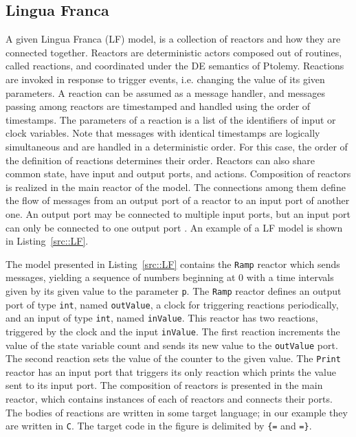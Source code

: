 \subsection{Lingua Franca}

\newcommand{\ReName}[0]{\mathit{ReName}}
\newcommand{\outport}[0]{\mathit{out}}
\newcommand{\inport}[0]{\mathit{in}}
\newcommand{\action}[0]{\mathit{ac}}
\newcommand{\reaction}[0]{\mathit{Reaction}}


A given Lingua Franca (LF) model, is a collection of reactors and how they are connected together. Reactors are deterministic actors composed out of routines, called reactions, and coordinated under the DE semantics of Ptolemy. Reactions are invoked in response to trigger events, i.e. changing the value of its given parameters. A reaction can be assumed as a message handler, and messages passing among reactors are timestamped and handled using the order of timestamps. The parameters of a reaction is a list of the identifiers of input or clock variables. Note that messages with identical timestamps are logically simultaneous and are handled in a deterministic order. For this case, the order of the definition of reactions determines their order. Reactors can also  share common state, have input and output ports, and actions. Composition of reactors is realized in the main reactor of the model. The connections among them define the flow of messages from an output port of a reactor to an input port of another one. An output port may be connected to multiple input ports, but an input port can only be connected to one output port \cite{DBLP:conf/cyphy/LohstrohRGDCLS19}. An example of a LF model is shown in Listing~\ref{src::LF}. 

\begin{example} 
The model presented in Listing~\ref{src::LF} contains the \texttt{Ramp} reactor which sends messages, yielding a sequence of numbers beginning at 0 with a time intervals given by its given value to the parameter \texttt{p}. The \texttt{Ramp} reactor defines an output port of type \texttt{int}, named \texttt{outValue}, a clock for triggering reactions periodically, and an input of type \texttt{int}, named \texttt{inValue}. This reactor has two reactions, triggered by the clock and the input \texttt{inValue}. The first reaction increments the value of the state variable count and sends its new value to the \texttt{outValue} port. The second reaction sets the value of the counter to the given value. The \texttt{Print} reactor has an input port that triggers its only reaction which prints the value sent to its input port. The composition of reactors is presented in the main reactor, which contains instances of each of reactors and connects their ports. The bodies of reactions are written in some target language; in our example they are written in \texttt{C}. The target code in the figure is delimited by \texttt{\{=} and \texttt{=\}}.
\end{example} 

